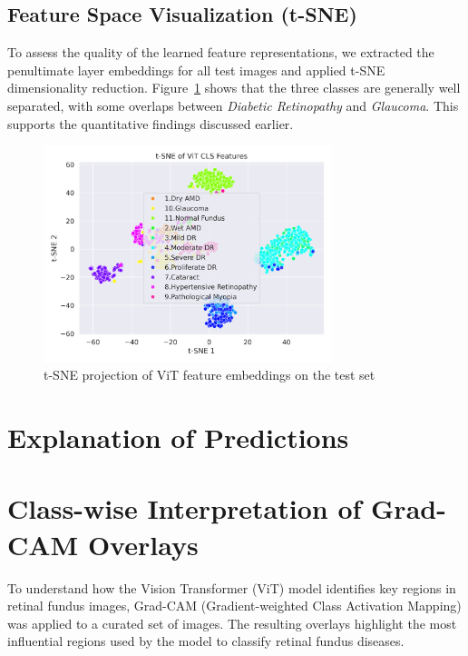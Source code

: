 \documentclass[a4paper,12pt]{report}
\begin{document}
\subsection{Feature Space Visualization (t-SNE)}

To assess the quality of the learned feature representations, we extracted the penultimate layer embeddings for all test images and applied t-SNE dimensionality reduction. Figure~\ref{fig:tsne} shows that the three classes are generally well separated, with some overlaps between \textit{Diabetic Retinopathy} and \textit{Glaucoma}. This supports the quantitative findings discussed earlier.

\begin{figure}[h]
    \centering
    \includegraphics[width=0.75\textwidth]{vit_tsne_plot.png}
    \caption{t-SNE projection of ViT feature embeddings on the test set}
    \label{fig:tsne}
\end{figure}

\section{Explanation of Predictions}




\section{Class-wise Interpretation of Grad-CAM Overlays}

To understand how the Vision Transformer (ViT) model identifies key regions in retinal fundus images, Grad-CAM (Gradient-weighted Class Activation Mapping) was applied to a curated set of images. The resulting overlays highlight the most influential regions used by the model to classify retinal fundus diseases.
\end{document}

